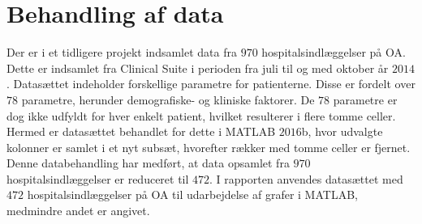 \section{Behandling af data}
Der er i et tidligere projekt indsamlet data fra $970$ hospitalsindlæggelser på OA. Dette er indsamlet fra Clinical Suite i perioden fra juli til og med oktober år $2014$. Datasættet indeholder forskellige parametre for patienterne. Disse er fordelt over $78$ parametre, herunder demografiske- og kliniske faktorer. De $78$ parametre er dog ikke udfyldt for hver enkelt patient, hvilket resulterer i flere tomme celler. Hermed er datasættet behandlet for dette i MATLAB $2016$b, hvor udvalgte kolonner er samlet i et nyt subsæt, hvorefter rækker med tomme celler er fjernet. Denne databehandling har medført, at data opsamlet fra $970$ hospitalsindlæggelser er reduceret til $472$. I rapporten anvendes datasættet med $472$ hospitalsindlæggelser på OA til udarbejdelse af grafer i MATLAB, medmindre andet er angivet.